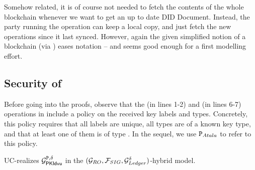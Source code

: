 Somehow related, it is of course not needed to fetch the contents of the whole
blockchain whenever we want to get an up to date DID Document. Instead, the
party running the operation can keep a local copy, and just fetch the new
operations since it last synced. However, again the given simplified notion of
a blockchain (via \IdealGdledger) eases notation -- and seems good enough for a
first modelling effort.

\subsection{Security of \RealPKIDIDAtala}
\label{ssec:sec-didatala}

Before going into the proofs, observe that the  (in lines 1-2) and
 (in lines 6-7) operations in \RealPKIDIDAtala include a policy on
the received key labels and types. Concretely, this policy requires that all
labels are unique, all types are of a known key type, and that at least one of
them is of type \MasterKey. In the sequel, we use $\P_{Atala}$ to refer to this
policy.


\begin{theorem}
  \label{thm:sec-didatala}
  \RealPKIDIDAtala UC-realizes $\IdealGPKIDID$ in the $(\IdealGRO,
  \IdealFSig, \IdealGdledger)$-hybrid model.
\end{theorem}

